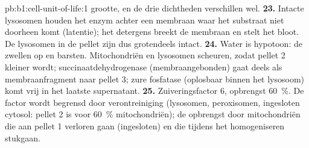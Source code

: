 \begin{solution}{pb:b1:cell-unit-of-life:1}
grootte, en de drie dichtheden verschillen wel.
\textbf{23.} Intacte lysosomen houden het enzym achter een membraan waar het
substraat niet doorheen komt (latentie); het detergens breekt de membraan en
stelt het bloot. De lysosomen in de pellet zijn dus grotendeels intact.
\textbf{24.} Water is hypotoon: de  zwellen op en barsten.
Mitochondriën en lysosomen scheuren, zodat pellet 2 kleiner wordt;
succinaatdehydrogenase (membraangebonden) gaat deels als membraanfragment naar
pellet 3; zure fosfatase (oplosbaar binnen het lysosoom) komt vrij in het laatste
supernatant.
\textbf{25.} Zuiveringsfactor $6$, opbrengst \qty{60}{\%}. De factor wordt
begrensd door verontreiniging (lysosomen, peroxisomen, ingesloten cytosol:
pellet 2 is voor \qty{60}{\%} mitochondriën); de opbrengst door mitochondriën die
aan pellet 1 verloren gaan (ingesloten) en die tijdens het homogeniseren
stukgaan.
\end{solution}
